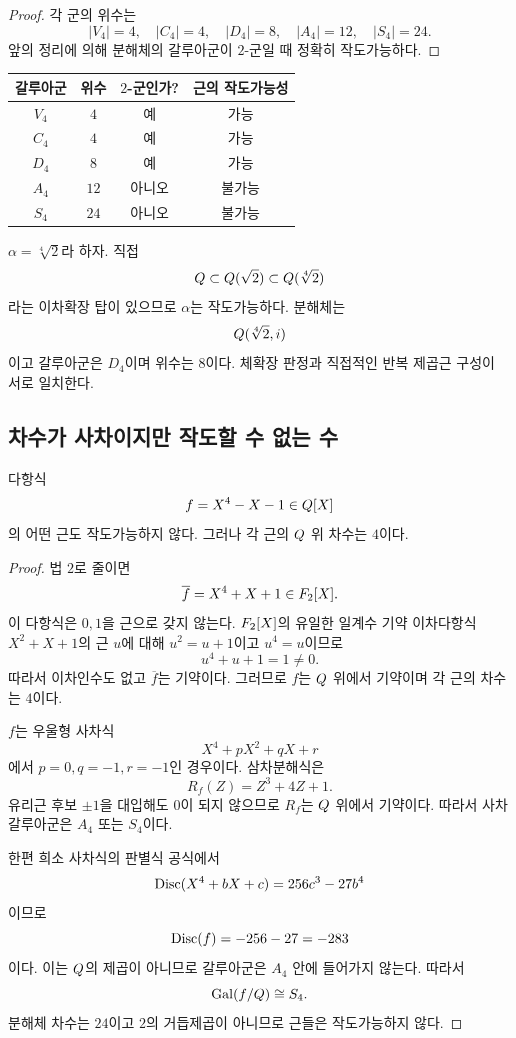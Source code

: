 \begin{proof}
각 군의 위수는
\[
  |V_4|=4,\quad |C_4|=4,\quad |D_4|=8,\quad
  |A_4|=12,\quad |S_4|=24.
\]
앞의 정리에 의해 분해체의 갈루아군이 $2$-군일 때 정확히 작도가능하다.
\end{proof}

\begin{center}
\renewcommand{\arraystretch}{1.2}
\begin{tabular}{cccc}
\toprule
갈루아군 & 위수 & $2$-군인가? & 근의 작도가능성 \\
\midrule
$V_4$ & $4$ & 예 & 가능 \\
$C_4$ & $4$ & 예 & 가능 \\
$D_4$ & $8$ & 예 & 가능 \\
$A_4$ & $12$ & 아니오 & 불가능 \\
$S_4$ & $24$ & 아니오 & 불가능 \\
\bottomrule
\end{tabular}
\end{center}

\begin{example}[$X^4-2$]
$\alpha=\sqrt[4]{2}$라 하자. 직접
\[
  Q\subset Q(\sqrt2)\subset Q(\sqrt[4]2)
\]
라는 이차확장 탑이 있으므로 $\alpha$는 작도가능하다. 분해체는
\[
  Q(\sqrt[4]2,i)
\]
이고 갈루아군은 $D_4$이며 위수는 $8$이다. 체확장 판정과 직접적인 반복 제곱근 구성이 서로 일치한다.
\end{example}

\subsection{차수가 사차이지만 작도할 수 없는 수}

\begin{example}
\label{ex:degree-four-nonconstructible}
다항식
\[
  f=X^4-X-1\in Q[X]
\]
의 어떤 근도 작도가능하지 않다. 그러나 각 근의 $Q$ 위 차수는 $4$이다.
\end{example}

\begin{proof}
법 $2$로 줄이면
\[
  \overline f=X^4+X+1\in F_2[X].
\]
이 다항식은 $0,1$을 근으로 갖지 않는다. $F_2[X]$의 유일한 일계수 기약 이차다항식 $X^2+X+1$의 근 $u$에 대해 $u^2=u+1$이고 $u^4=u$이므로
\[
  u^4+u+1=1\ne0.
\]
따라서 이차인수도 없고 $\overline f$는 기약이다. 그러므로 $f$는 $Q$ 위에서 기약이며 각 근의 차수는 $4$이다.

$f$는 우울형 사차식
\[
  X^4+pX^2+qX+r
\]
에서 $p=0,q=-1,r=-1$인 경우이다. 삼차분해식은
\[
  R_f(Z)=Z^3+4Z+1.
\]
유리근 후보 $\pm1$을 대입해도 $0$이 되지 않으므로 $R_f$는 $Q$ 위에서 기약이다. 따라서 사차 갈루아군은 $A_4$ 또는 $S_4$이다.

한편 희소 사차식의 판별식 공식에서
\[
  \operatorname{Disc}(X^4+bX+c)=256c^3-27b^4
\]
이므로
\[
  \operatorname{Disc}(f)=-256-27=-283
\]
이다. 이는 $Q$의 제곱이 아니므로 갈루아군은 $A_4$ 안에 들어가지 않는다. 따라서
\[
  \operatorname{Gal}(f/Q)\cong S_4.
\]
분해체 차수는 $24$이고 $2$의 거듭제곱이 아니므로 근들은 작도가능하지 않다.
\end{proof}

